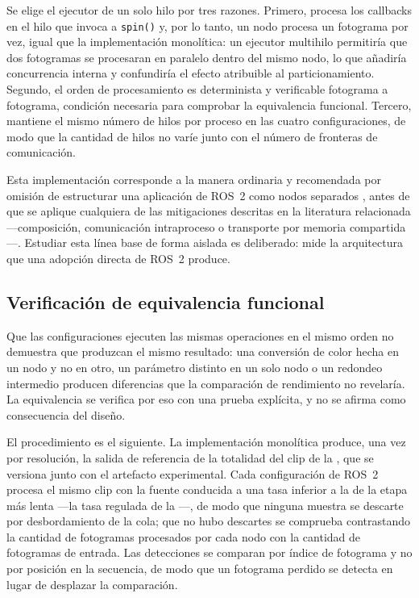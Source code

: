 Se elige el ejecutor de un solo hilo por tres razones. Primero, procesa los
callbacks en el hilo que invoca a \texttt{spin()} y, por lo tanto, un nodo
procesa un fotograma por vez, igual que la implementación monolítica: un
ejecutor multihilo permitiría que dos fotogramas se procesaran en paralelo
dentro del mismo nodo, lo que añadiría concurrencia interna y confundiría el
efecto atribuible al particionamiento. Segundo, el orden de procesamiento es
determinista y verificable fotograma a fotograma, condición necesaria para
comprobar la equivalencia funcional. Tercero, mantiene el mismo número de
hilos por proceso en las cuatro configuraciones, de modo que la cantidad de
hilos no varíe junto con el número de fronteras de comunicación.

Esta implementación corresponde a la manera ordinaria y recomendada por
omisión de estructurar una aplicación de ROS~2 como nodos separados
\cite{macenski2022}, antes de que se aplique cualquiera de las mitigaciones
descritas en la literatura relacionada---composición, comunicación
intraproceso o transporte por memoria compartida \cite{macenski2023,
kamiya2025}---. Estudiar esta línea base de forma aislada es deliberado:
mide la arquitectura que una adopción directa de ROS~2 produce.

\subsection{Verificación de equivalencia funcional}
\label{sec:equivalence}

Que las configuraciones ejecuten las mismas operaciones en el mismo orden no
demuestra que produzcan el mismo resultado: una conversión de color hecha en
un nodo y no en otro, un parámetro distinto en un solo nodo o un redondeo
intermedio producen diferencias que la comparación de rendimiento no
revelaría. La equivalencia se verifica por eso con una prueba explícita, y no
se afirma como consecuencia del diseño.

El procedimiento es el siguiente. La implementación monolítica produce, una
vez por resolución, la salida de referencia de la totalidad del clip de la
, que se versiona junto con el artefacto
experimental. Cada configuración de ROS~2 procesa el mismo clip con la
fuente conducida a una tasa inferior a la de la etapa más lenta ---la tasa
regulada de la ---, de modo que ninguna muestra se
descarte por desbordamiento de la cola; que no hubo
descartes se comprueba contrastando la cantidad de fotogramas procesados por
cada nodo con la cantidad de fotogramas de entrada. Las detecciones se
comparan por índice de fotograma y no por posición en la secuencia, de modo
que un fotograma perdido se detecta en lugar de desplazar la comparación.

